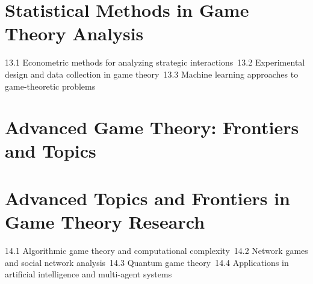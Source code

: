 \section{Statistical Methods in Game Theory Analysis}
13.1 Econometric methods for analyzing strategic interactions\
13.2 Experimental design and data collection in game theory\
13.3 Machine learning approaches to game-theoretic problems\
\section{Advanced Game Theory: Frontiers and Topics}
\section{Advanced Topics and Frontiers in Game Theory Research}
14.1 Algorithmic game theory and computational complexity\
14.2 Network games and social network analysis\
14.3 Quantum game theory\
14.4 Applications in artificial intelligence and multi-agent systems\
